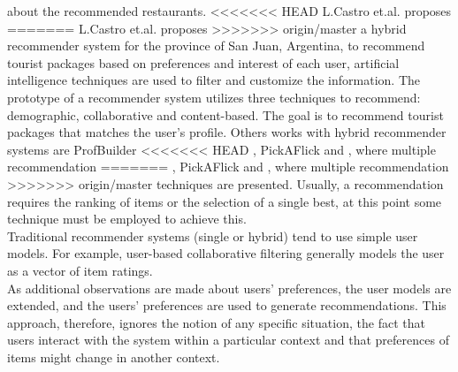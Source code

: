 about the recommended restaurants.
<<<<<<< HEAD
L.Castro et.al. \cite{castro2012prototype} proposes  
=======
L.Castro et.al.\cite{castro2012prototype} proposes  
>>>>>>> origin/master
a hybrid recommender system for the province of San Juan, Argentina, 
to recommend tourist packages  based on preferences and interest 
of each user, artificial intelligence
techniques are used to filter and customize the information. The
prototype of a recommender system utilizes three techniques to
recommend: demographic, collaborative and content-based. The goal is
to recommend tourist packages that matches the user's profile.
Others works with hybrid recommender systems are ProfBuilder
<<<<<<< HEAD
  \cite{al1999semantic}, PickAFlick \cite{burke1999integrating}  and
  \cite{tran2000hybrid}, where multiple recommendation
=======
\cite{al1999semantic}, PickAFlick\cite{burke1999integrating}  and
\cite{tran2000hybrid}, where multiple recommendation
>>>>>>> origin/master
techniques are presented. Usually, a recommendation requires the ranking of
items or the selection of a single best, at this point some
technique must be employed to achieve this. \\ 
Traditional recommender systems (single or hybrid) tend to use
simple user models. For example, user-based collaborative filtering
generally models the user as a vector of item ratings. \\ As additional
observations are made about users' preferences, the user models are
extended, and the users' preferences are used to generate
recommendations. This approach, therefore, ignores the notion of any
specific situation, the fact that users interact with the system
within a particular context and  that preferences of items might 
change in another context. 

